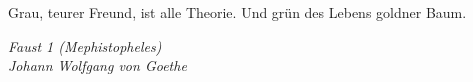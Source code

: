 
{
	
\epigraph{
	Grau, teurer Freund, ist alle Theorie.
	Und grün des Lebens goldner Baum.\footnotemark\ 
}{\textit{
	Faust 1 (Mephistopheles) \\ Johann Wolfgang von Goethe}}
}